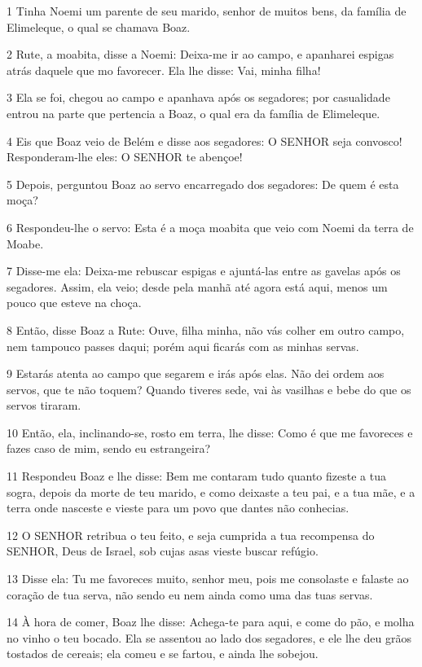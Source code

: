 \par 1 Tinha Noemi um parente de seu marido, senhor de muitos bens, da família de Elimeleque, o qual se chamava Boaz.
\par 2 Rute, a moabita, disse a Noemi: Deixa-me ir ao campo, e apanharei espigas atrás daquele que mo favorecer. Ela lhe disse: Vai, minha filha!
\par 3 Ela se foi, chegou ao campo e apanhava após os segadores; por casualidade entrou na parte que pertencia a Boaz, o qual era da família de Elimeleque.
\par 4 Eis que Boaz veio de Belém e disse aos segadores: O SENHOR seja convosco! Responderam-lhe eles: O SENHOR te abençoe!
\par 5 Depois, perguntou Boaz ao servo encarregado dos segadores: De quem é esta moça?
\par 6 Respondeu-lhe o servo: Esta é a moça moabita que veio com Noemi da terra de Moabe.
\par 7 Disse-me ela: Deixa-me rebuscar espigas e ajuntá-las entre as gavelas após os segadores. Assim, ela veio; desde pela manhã até agora está aqui, menos um pouco que esteve na choça.
\par 8 Então, disse Boaz a Rute: Ouve, filha minha, não vás colher em outro campo, nem tampouco passes daqui; porém aqui ficarás com as minhas servas.
\par 9 Estarás atenta ao campo que segarem e irás após elas. Não dei ordem aos servos, que te não toquem? Quando tiveres sede, vai às vasilhas e bebe do que os servos tiraram.
\par 10 Então, ela, inclinando-se, rosto em terra, lhe disse: Como é que me favoreces e fazes caso de mim, sendo eu estrangeira?
\par 11 Respondeu Boaz e lhe disse: Bem me contaram tudo quanto fizeste a tua sogra, depois da morte de teu marido, e como deixaste a teu pai, e a tua mãe, e a terra onde nasceste e vieste para um povo que dantes não conhecias.
\par 12 O SENHOR retribua o teu feito, e seja cumprida a tua recompensa do SENHOR, Deus de Israel, sob cujas asas vieste buscar refúgio.
\par 13 Disse ela: Tu me favoreces muito, senhor meu, pois me consolaste e falaste ao coração de tua serva, não sendo eu nem ainda como uma das tuas servas.
\par 14 À hora de comer, Boaz lhe disse: Achega-te para aqui, e come do pão, e molha no vinho o teu bocado. Ela se assentou ao lado dos segadores, e ele lhe deu grãos tostados de cereais; ela comeu e se fartou, e ainda lhe sobejou.
